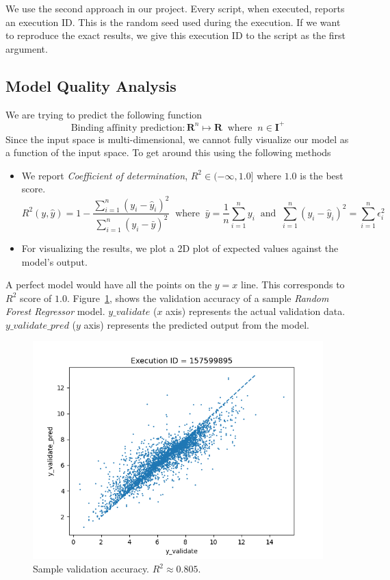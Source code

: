\documentclass[11pt]{article}
\begin{document}
We use the second approach in our project. Every script, when executed, reports an execution ID. This is the random seed used during the execution. If we want to reproduce the exact results, we give this execution ID to the script as the first argument.

\subsection{Model Quality Analysis}
We are trying to predict the following function
$$ \textrm{Binding affinity prediction} : \mathbf{R}^n \mapsto \mathbf{R} \;\; \textrm{where} \;\; n \in \mathbf{I}^+$$
Since the input space is multi-dimensional, we cannot fully visualize our model as a function of the input space.
To get around this using the following methods
\begin{itemize}
\item We report \textit{Coefficient of determination}, $R^2  \in (- \infty, 1.0]$ where $1.0$ is the best score. \cite{r_squared_score}
$$R^2(y, \hat{y}) = 1 - \frac{\sum_{i=1}^{n} (y_i - \hat{y}_i)^2}{\sum_{i=1}^{n} (y_i - \bar{y})^2} \;\; \textrm{where} \;\; \bar{y} = \frac{1}{n} \sum_{i=1}^{n} y_i \;\;
\textrm{and} \;\; \sum_{i=1}^{n} (y_i - \hat{y}_i)^2 = \sum_{i=1}^{n} \epsilon_i^2$$

\item For visualizing the results,  we plot a 2D plot of expected values against the model's output. 
\end{itemize}

A perfect model would have all the points on the $y = x$ line.  This corresponds to $R^2$ score of $1.0$. 
Figure~\ref{fig:modelQualityVisualization},  shows the validation accuracy of a sample \textit{Random Forest Regressor} model.
$y\_validate$ ($x$ axis) represents the actual validation data.
$y\_validate\_pred$ ($y$ axis) represents the predicted output from the model.

\begin{figure}[htb]
  \centering
    \includegraphics[width=1.0\textwidth]{images/accuracy_validate}
    \caption{Sample validation accuracy.  $R^2 \approx 0.805$.}
    \label{fig:modelQualityVisualization}
\end{figure}
\end{document}
